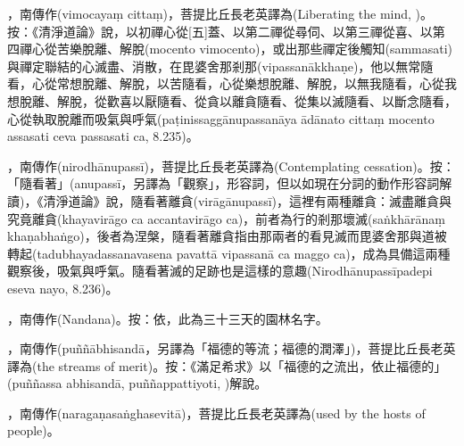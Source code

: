 \startitemgroup[noteitems]
\item{}，南傳作(vimocayaṃ cittaṃ)，菩提比丘長老英譯為(Liberating the mind, )。按：《清淨道論》說，以初禪心從[五]蓋、以第二禪從尋伺、以第三禪從喜、以第四禪心從苦樂脫離、解脫(mocento vimocento)，或出那些禪定後觸知(sammasati)與禪定聯結的心滅盡、消散，在毘婆舍那剎那(vipassanākkhaṇe)，他以無常隨看，心從常想脫離、解脫，以苦隨看，心從樂想脫離、解脫，以無我隨看，心從我想脫離、解脫，從歡喜以厭隨看、從貪以離貪隨看、從集以滅隨看、以斷念隨看，心從執取脫離而吸氣與呼氣(paṭinissaggānupassanāya ādānato cittaṃ mocento assasati ceva passasati ca, 8.235)。
\stopitemgroup

\startitemgroup[noteitems]
\item{}，南傳作(nirodhānupassī)，菩提比丘長老英譯為(Contemplating cessation)。按：「隨看著」(anupassī，另譯為「觀察」，形容詞，但以如現在分詞的動作形容詞解讀)，《清淨道論》說，隨看著離貪(virāgānupassī)，這裡有兩種離貪：滅盡離貪與究竟離貪(khayavirāgo ca accantavirāgo ca)，前者為行的剎那壞滅(saṅkhārānaṃ khaṇabhaṅgo)，後者為涅槃，隨看著離貪指由那兩者的看見滅而毘婆舍那與道被轉起(tadubhayadassanavasena pavattā vipassanā ca maggo ca)，成為具備這兩種觀察後，吸氣與呼氣。隨看著滅的足跡也是這樣的意趣(Nirodhānupassīpadepi eseva nayo, 8.236)。
\stopitemgroup

\startitemgroup[noteitems]
\item{}，南傳作(Nandana)。按：依，此為三十三天的園林名字。
\stopitemgroup

\startitemgroup[noteitems]
\item{}，南傳作(puññābhisandā，另譯為「福德的等流；福德的潤澤」)，菩提比丘長老英譯為(the streams of merit)。按：《滿足希求》以「福德的之流出，依止福德的」(puññassa abhisandā, puññappattiyoti, )解說。
\stopitemgroup

\startitemgroup[noteitems]
\item{}，南傳作(naragaṇasaṅghasevitā)，菩提比丘長老英譯為(used by the hosts of people)。
\stopitemgroup

